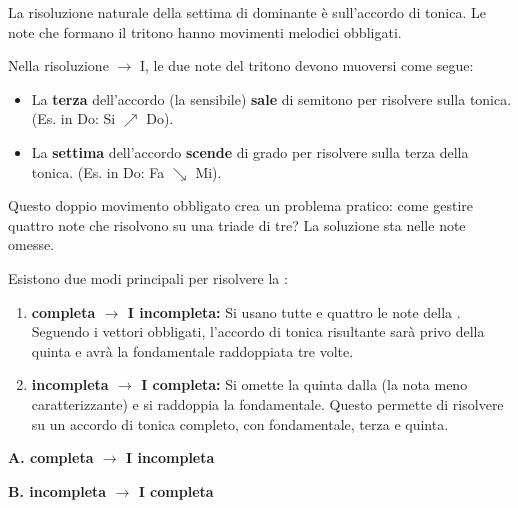 La risoluzione naturale della settima di dominante è sull'accordo di tonica. Le note che formano il tritono hanno movimenti melodici obbligati.

\begin{regola}
	\label{reg:vettori_obbligati}
	Nella risoluzione  $\rightarrow$ I, le due note del tritono devono muoversi come segue:
	\begin{itemize}
		\item La \textbf{terza} dell'accordo (la sensibile) \textbf{sale} di semitono per risolvere sulla tonica. (Es. in Do: Si $\nearrow$ Do).
		\item La \textbf{settima} dell'accordo \textbf{scende} di grado per risolvere sulla terza della tonica. (Es. in Do: Fa $\searrow$ Mi).
	\end{itemize}
\end{regola}

Questo doppio movimento obbligato crea un problema pratico: come gestire quattro note che risolvono su una triade di tre? La soluzione sta nelle note omesse.

\begin{definizione}
	\label{def:v7_completa_incompleta}
	Esistono due modi principali per risolvere la :
	\begin{enumerate}
		\item \textbf{ completa $\rightarrow$ I incompleta:} Si usano tutte e quattro le note della . Seguendo i vettori obbligati, l'accordo di tonica risultante sarà privo della quinta e avrà la fondamentale raddoppiata tre volte.
		\item \textbf{ incompleta $\rightarrow$ I completa:} Si omette la quinta dalla  (la nota meno caratterizzante) e si raddoppia la fondamentale. Questo permette di risolvere su un accordo di tonica completo, con fondamentale, terza e quinta.
	\end{enumerate}
\end{definizione}

\begin{esempio}
	\label{ex:due_risoluzioni_v7}
	\textbf{A.  completa $\rightarrow$ I incompleta}
	
	\vspace{1cm}
	\textbf{B.  incompleta $\rightarrow$ I completa}
\end{esempio}


